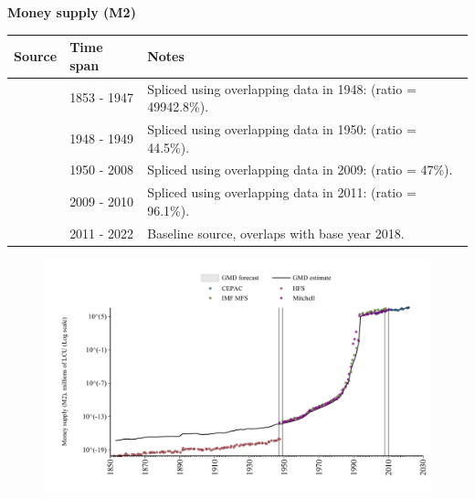 \documentclass[12pt,a4paper,landscape]{article}
\begin{document}
\begin{adjustbox}{max totalsize={\paperwidth}{\paperheight},center}
\begin{minipage}[t][\textheight][t]{\textwidth}
\vspace*{0.5cm}
{}
\begin{center}
{\Large\bfseries Money supply (M2)}
\end{center}
\vspace{0.5cm}
\begin{table}[H]
\centering
\small
\begin{tabular}{|l|l|l|}
\hline
\textbf{Source} & \textbf{Time span} & \textbf{Notes} \\
\hline
\rowcolor{white}\cite{HFS}& 1853 - 1947 &Spliced using overlapping data in 1948: (ratio = 49942.8\%). \\
\rowcolor{lightgray}\cite{Mitchell}& 1948 - 1949 &Spliced using overlapping data in 1950: (ratio = 44.5\%). \\
\rowcolor{white}\cite{IMF_MFS}& 1950 - 2008 &Spliced using overlapping data in 2009: (ratio = 47\%). \\
\rowcolor{lightgray}\cite{Mitchell}& 2009 - 2010 &Spliced using overlapping data in 2011: (ratio = 96.1\%). \\
\rowcolor{white}\cite{CEPAC}& 2011 - 2022 &Baseline source, overlaps with base year 2018. \\
\hline
\end{tabular}
\end{table}
\begin{figure}[H]
\centering
\includegraphics[width=\textwidth,height=0.6\textheight,keepaspectratio]{graphs/BRA_M2.pdf}
\end{figure}
\end{minipage}
\end{adjustbox}
\end{document}
